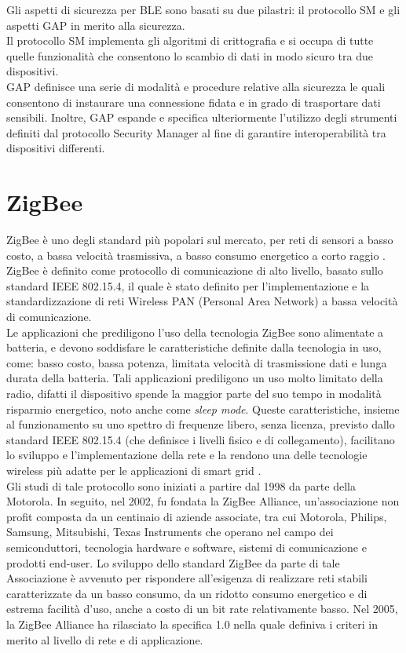 \noindent Gli aspetti di sicurezza per BLE sono basati su due pilastri: il protocollo SM e gli aspetti GAP in merito alla sicurezza.\\
Il protocollo SM implementa gli algoritmi di crittografia e si occupa di tutte quelle funzionalità che consentono lo scambio di dati in modo sicuro tra due dispositivi.\\
GAP definisce una serie di modalità e procedure relative alla sicurezza le quali consentono di instaurare una connessione fidata e in grado di trasportare dati sensibili. Inoltre, GAP espande e specifica ulteriormente l'utilizzo degli strumenti definiti dal protocollo Security Manager al fine di garantire interoperabilità tra dispositivi differenti.

\section{ZigBee}
ZigBee è uno degli standard più popolari sul mercato, per reti di sensori a basso costo, a bassa velocità trasmissiva, a basso consumo energetico a corto raggio \cite{farahani2011zigbee}. ZigBee è definito come protocollo di comunicazione di alto livello, basato sullo standard IEEE 802.15.4, il quale è stato definito per l'implementazione e la standardizzazione di reti Wireless PAN (Personal Area Network) a bassa velocità di comunicazione.\\

\noindent Le applicazioni che prediligono l'uso della tecnologia ZigBee sono alimentate a batteria, e devono soddisfare le caratteristiche definite dalla tecnologia in uso, come: basso costo, bassa potenza, limitata velocità di trasmissione dati e lunga durata della batteria. Tali applicazioni prediligono un uso molto limitato della radio, difatti il dispositivo spende la maggior parte del suo tempo in modalità risparmio energetico, noto anche come \textit{sleep mode}.
Queste caratteristiche, insieme al funzionamento su uno spettro di frequenze libero, senza licenza, previsto dallo standard IEEE 802.15.4 (che definisce i livelli fisico e di collegamento), facilitano lo sviluppo e l'implementazione della rete e la rendono una delle tecnologie wireless più adatte per le applicazioni di smart grid \cite{yi2010developing}.\\

\noindent Gli studi di tale protocollo sono iniziati a partire dal 1998 da parte della Motorola. In seguito, nel 2002, fu fondata la ZigBee Alliance, un'associazione non profit composta da un centinaio di aziende associate, tra cui Motorola, Philips, Samsung, Mitsubishi, Texas Instruments che operano nel campo dei semiconduttori, tecnologia hardware e software, sistemi di comunicazione e prodotti end-user. Lo sviluppo dello standard ZigBee da parte di tale Associazione è avvenuto per rispondere all'esigenza di realizzare reti stabili caratterizzate da un basso consumo, da un ridotto consumo energetico e di estrema facilità d'uso, anche a costo di un bit rate relativamente basso. Nel 2005, la ZigBee Alliance ha rilasciato la specifica 1.0 nella quale definiva i criteri in merito al livello di rete e di applicazione.

